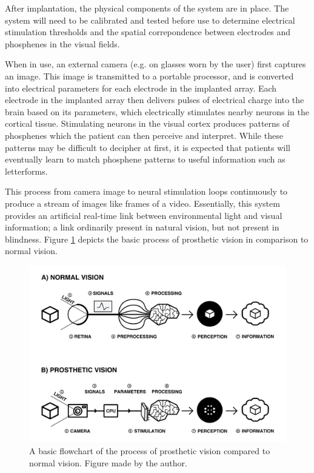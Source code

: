\documentclass[a4paper,11pt,openany]{book}
\begin{document}
After implantation, the physical components of the system are in place.
The system will need to be calibrated and tested before use to determine electrical stimulation thresholds and the spatial correpondence between electrodes and phosphenes in the visual fields. \cite{lowery_restoration_2015,fernandez_cortivis_2017}

When in use, an external camera (e.g. on glasses worn by the user) first captures an image. \cite{lowery_monash_2017,lewis_restoration_2015}
This image is transmitted to a portable processor, and is converted into electrical parameters for each electrode in the implanted array.
Each electrode in the implanted array then delivers pulses of electrical charge into the brain based on its parameters, which electrically stimulates nearby neurons in the cortical tissue.
Stimulating neurons in the visual cortex produces patterns of phosphenes which the patient can then perceive and interpret. \cite{brindley_sensations_1968,dobelle_phosphenes_1974,bak_visual_1990}
While these patterns may be difficult to decipher at first, it is expected that patients will eventually learn to match phosphene patterns to useful information such as letterforms. \cite{fernandez_cortivis_2017}

This process from camera image to neural stimulation loops continuously to produce a stream of images like frames of a video.
Essentially, this system provides an artificial real-time link between environmental light and visual information; a link ordinarily present in natural vision, but not present in blindness.
Figure \ref{fig:org18a9ed1} depicts the basic process of prosthetic vision in comparison to normal vision.

\begin{figure}[htbp]
\centering
\includegraphics[angle=90,width=.9\linewidth]{./graphics/litreview/flowchart.png}
\caption[Basic flowchart of the process of prosthetic vision compared to normal vision]{\label{fig:org18a9ed1}
A basic flowchart of the process of prosthetic vision compared to normal vision. Figure made by the author.}
\end{figure}
\end{document}
